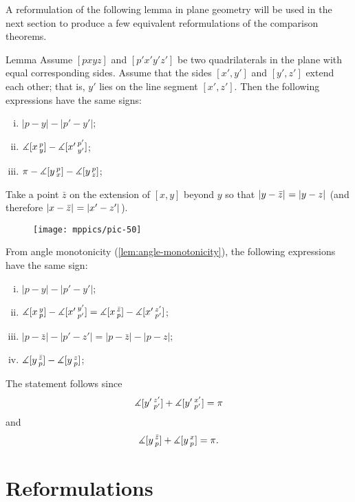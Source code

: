 A reformulation of the following lemma in plane geometry will be used in the next section to produce a few equivalent reformulations of the comparison theorems.

\begin{thm}{Lemma}
\label{lem:alex}
Assume $[pxyz]$ and $[p'x'y'z']$ be two quadrilaterals in the plane with equal corresponding sides.
Assume that the sides $[x',y']$ and $[y',z']$ extend each other; that is, $y'$ lies on the line segment $[x',z']$.
Then the following expressions have the same signs:
\begin{enumerate}[(i)]
 \item $|p-y|-|p'-y'|$;
 \item $\measuredangle[x\,{}^{p}_{y}]-\measuredangle[x'\,{}^{p'}_{y'}]$;
 \item $\pi-\measuredangle[y\,{}^{p}_{x}]-\measuredangle[y\,{}^{p}_{z}]$;
\end{enumerate}
\end{thm}

Take 
a point $\bar z$ on the extension of 
$[x,y]$ beyond $y$ so that $\dist{y}{\bar z}{}=\dist{y}{z}{}$ (and therefore $\dist{x}{\bar z}{}=\dist{x'}{z'}{}$). 
 
\begin{figure}[h!]
\vskip-0mm
\centering
\texttt{[image: mppics/pic-50]}
\vskip-0mm
\end{figure}

From angle monotonicity (\ref{lem:angle-monotonicity}), 
the following expressions have the same sign:
\begin{enumerate}[(i)]
\item $|p-y|-|p'-y'|$;
\item $\measuredangle[x\,{}^{y}_{p}]-\measuredangle[x'\,{}^{y'}_{p'}]=\measuredangle[x\,{}^{\bar z}_{p}]-\measuredangle[x'\,{}^{z'}_{p'}]$;
\item $|p-\bar z|-|p'-z'| =  | p - \bar z  | - | p-z  | $;
\item $\measuredangle[y\,{}^{\bar z}_{p}]-\measuredangle[y\,{}^{z}_{p}]$;
\end{enumerate}
The statement follows since
\[\measuredangle[y'\,{}^{z'}_{p'}]+\measuredangle[y'\,{}^{x'}_{p'}]=\pi\]
and
\[\measuredangle[y\,{}^{\bar z}_{p}]+\measuredangle[y\,{}^{x}_{p}]=\pi.\]
\qedsf

\section{Reformulations}

